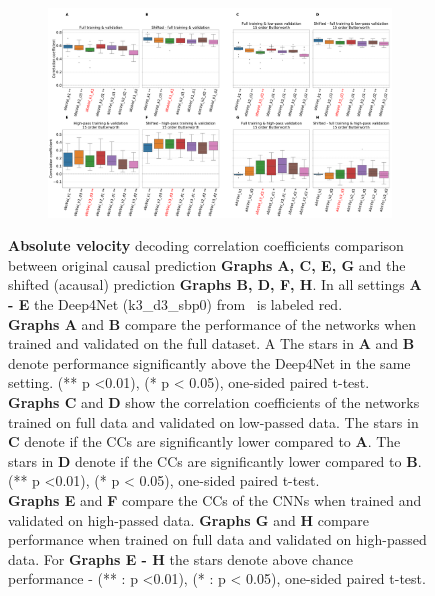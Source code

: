 \begin{figure}[!htbp]\ContinuedFloat
\begin{subfigure}[t]{\textwidth}
   \includegraphics[width=1\linewidth]{img/ch4/shifted_vs_non_shifted_absVel_performance_comparison}
   \caption{}
\end{subfigure}\label{fig:shifted-performance-absVel}
\caption[]{{\textbf{Absolute velocity} decoding correlation coefficients comparison between original causal prediction \textbf{Graphs A, C, E, G} and the shifted (acausal) prediction \textbf{Graphs B, D, F, H}. In all settings \textbf{
   A - E} the Deep4Net (k3\_d3\_sbp0) from~\cite{Hammer-2021} is labeled red.\\ \textbf{Graphs A} and \textbf{B} compare the performance of the networks when trained and validated on the full dataset. A The stars in \textbf{A} and \textbf{B} denote performance significantly above the Deep4Net in the same setting. (** p <0.01), (* p < 0.05), one-sided paired t-test.
   \\\textbf{Graphs C} and \textbf{D} show the correlation coefficients of the networks trained on full data and validated on low-passed data. 
   The stars in \textbf{C} denote if the CCs are significantly lower compared to \textbf{A}. The stars in \textbf{D} denote if the CCs are significantly lower compared to \textbf{B}. (** p <0.01), (* p < 0.05), one-sided paired t-test.
   \\\textbf{Graphs E} and \textbf{F} compare the CCs of the CNNs when trained and validated on high-passed data. \textbf{Graphs G} and \textbf{H} compare performance when trained on full data and validated on high-passed data. For \textbf{Graphs E - H} the stars denote above chance performance - (** : p <0.01), (* : p < 0.05), one-sided paired t-test.}}
\end{figure}\label{fig:shifted-performance}

